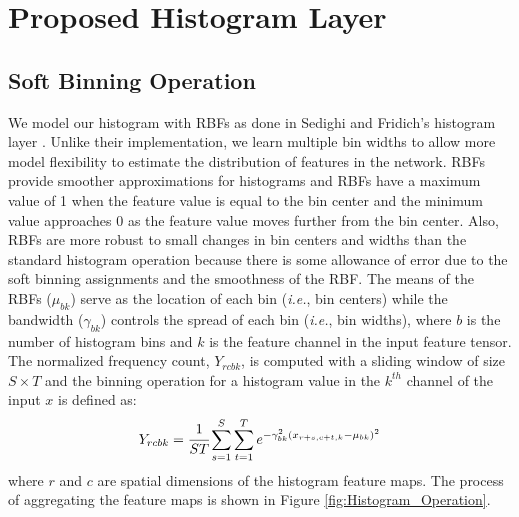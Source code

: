 \documentclass[journal]{IEEEtai}
\begin{document}
\section{Proposed Histogram Layer}
	\subsection{Soft Binning Operation}
	 We model our histogram with RBFs as done in Sedighi and Fridich's histogram layer \mbox{\cite{sedighi2017histogram}}. Unlike their implementation, we learn multiple bin widths to allow more model flexibility to estimate the distribution of features in the network. RBFs provide smoother approximations for histograms and RBFs have a maximum value of 1 when the feature value is equal to the bin center and the minimum value approaches 0 as the feature value moves further from the bin center. Also, RBFs are more robust to small changes
	 in bin centers and widths than the standard histogram operation because there is some allowance of error due to the soft binning assignments and the smoothness of the RBF. The means of the RBFs ($\mu_{bk}$) serve as the location of each bin (\textit{i.e.}, bin centers) while the bandwidth ($\gamma_{bk}$) controls the spread of each bin (\textit{i.e.}, bin widths), where $b$ is the number of histogram bins and $k$ is the feature channel in the input feature tensor. The normalized frequency count, $Y_{rcbk}$, is computed with a sliding window of size $S \times T$ and the binning operation for a histogram value in the $k^{th}$ channel of the input $x$ is defined as: 
	\begin{equation}
	Y_{rcbk} =  
	\cfrac{1}{ST}\sum_{s=1}^{S}\sum_{t=1}^{T}e^{-\gamma_{bk}^2\left(x_{r+s,c+t,k}-\mu_{bk}\right)^2}
	\label{equation:RBF}
	\end{equation}
	where $r$ and $c$ are spatial dimensions of the histogram feature maps.
	The process of aggregating the feature maps is shown in Figure \ref{fig:Histogram_Operation}.
	
\end{document}
